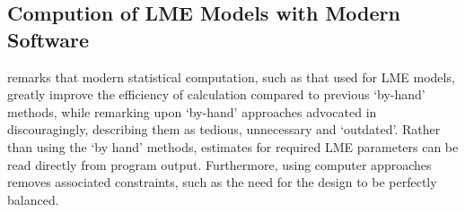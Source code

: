 \documentclass[12pt, a4paper]{report}
\theoremstyle{plain}
\theoremstyle{definition}
\theoremstyle{remark}
\begin{document}

	
	\subsection{Compution of LME Models with Modern Software}
	\citet{BXC2008} remarks that modern statistical computation, such as that used for LME models, greatly improve the efficiency of
	calculation compared to previous `by-hand' methods, while remarking upon `by-hand' approaches advocated in \citet{BA99} discouragingly, describing them as tedious, unnecessary and `outdated'. Rather than using the `by hand' methods, estimates for required LME parameters can be read directly from program output. Furthermore, using computer approaches removes associated constraints, such as the need for the design to be perfectly balanced.
	

	
	
	
	
	
\end{document}
